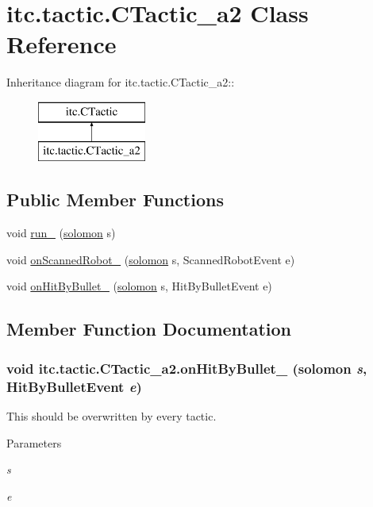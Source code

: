\hypertarget{classitc_1_1tactic_1_1_c_tactic__a2}{
\section{itc.tactic.CTactic\_\-a2 Class Reference}
\label{classitc_1_1tactic_1_1_c_tactic__a2}
}
Inheritance diagram for itc.tactic.CTactic\_\-a2::\begin{figure}[H]
\begin{center}
\leavevmode
\includegraphics[height=2cm]{classitc_1_1tactic_1_1_c_tactic__a2}
\end{center}
\end{figure}
\subsection*{Public Member Functions}
\begin{DoxyCompactItemize}
\item 
void \hyperlink{classitc_1_1tactic_1_1_c_tactic__a2_a71e36f42565ca1436eb1ee71f3d94312}{run\_\-} (\hyperlink{classitc_1_1solomon}{solomon} s)
\item 
void \hyperlink{classitc_1_1tactic_1_1_c_tactic__a2_a2448157d91e699740cf8a99f99b0c456}{onScannedRobot\_\-} (\hyperlink{classitc_1_1solomon}{solomon} s, ScannedRobotEvent e)
\item 
void \hyperlink{classitc_1_1tactic_1_1_c_tactic__a2_a774862588c2b010b16e2709d922db24d}{onHitByBullet\_\-} (\hyperlink{classitc_1_1solomon}{solomon} s, HitByBulletEvent e)
\end{DoxyCompactItemize}


\subsection{Member Function Documentation}
\hypertarget{classitc_1_1tactic_1_1_c_tactic__a2_a774862588c2b010b16e2709d922db24d}{
\subsubsection[{onHitByBullet\_\-}]{\setlength{\rightskip}{0pt plus 5cm}void itc.tactic.CTactic\_\-a2.onHitByBullet\_\- ({\bf solomon} {\em s}, \/  HitByBulletEvent {\em e})}}
\label{classitc_1_1tactic_1_1_c_tactic__a2_a774862588c2b010b16e2709d922db24d}
This should be overwritten by every tactic. 
\begin{DoxyParams}{Parameters}
\item[{\em s}]\item[{\em e}]\end{DoxyParams}


